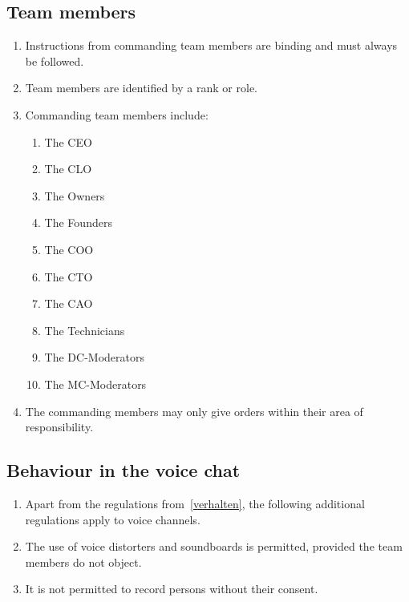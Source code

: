 \documentclass{article}
\begin{document}
\subsection{Team members}\label{members}
\begin{enumerate}[(1)]
	\item Instructions from commanding team members are binding and must always be followed.
	\item Team members are identified by a rank or role.
	\item Commanding team members include:
	\begin{enumerate}
		\item The CEO
		\item The CLO
		\item The Owners
		\item The Founders
		\item The COO
		\item The CTO
		\item The CAO
		\item The Technicians
		\item The DC-Moderators
		\item The MC-Moderators
	\end{enumerate}
	\item The commanding members may only give orders within their area of responsibility.
\end{enumerate}

\subsection{Behaviour in the voice chat}
\begin{enumerate}[(1)]
    \item Apart from the regulations from~\ref{verhalten}, the following additional regulations apply to voice channels.
	\item The use of voice distorters and soundboards is permitted, provided the team members do not object.
	\item It is not permitted to record persons without their consent.
\end{enumerate}
\end{document}
